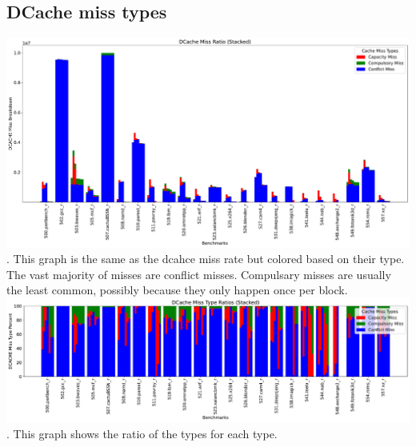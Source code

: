 \documentclass{article}
\begin{document}
\subsection*{DCache miss types}
\includegraphics[width=\textwidth]{Part3_4/DCACHE_MISS_STACKED.pdf}.
This graph is the same as the dcahce miss rate but colored based on their type. The vast majority of misses are conflict misses. Compulsary misses are usually the least common, possibly because they only happen once per block.\\
\includegraphics[width=\textwidth]{Part3_4/DCACHE_MISS_STACKED_RATIO.pdf}.
This graph shows the ratio of the types for each type.
\end{document}
